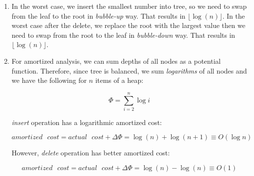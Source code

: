 \begin{enumerate}
\item 
In the worst case, we insert the smallest number into tree, so we need to swap from the leaf to the root in \textit{bubble-up} way. That results in $\lfloor \log(n) \rfloor $.
In the worst case after the delete, we replace the root with the largest value then we need to swap from the root to the leaf in \textit{bubble-down} way. That results in $\lfloor \log(n) \rfloor$.

\item 
For amortized analysis, we can sum depths of all nodes as a potential function. Therefore, since tree is balanced, we sum \textit{logarithms} of all nodes and we have the following for $n$ items of a heap:

  $$
    \Phi = \sum_{i=2}^{n} \log i
  $$

\textit{insert} operation has a logarithmic amortized cost:

  $$
    amortized\text{ }cost = actual\text{ }cost + \Delta\Phi = \log(n) + \log(n+1) \equiv O(\log n)
  $$
  
However, \textit{delete} operation has better amortized cost:

  $$
    amortized\text{ }cost = actual\text{ }cost + \Delta\Phi = \log(n) - \log(n) \equiv O(1)
  $$
  
\end{enumerate}
